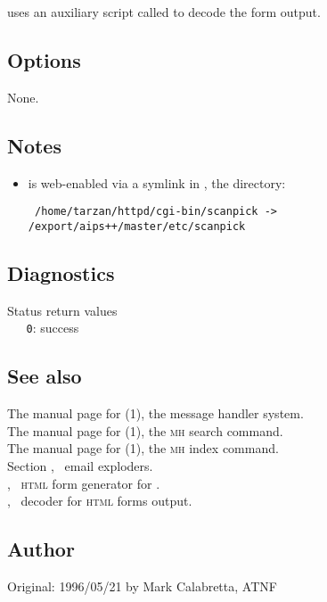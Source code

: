  uses an auxiliary  script called
 to decode the form output.

\subsection*{Options}

None.

\subsection*{Notes}

\begin{itemize}
\item
    is web-enabled via a symlink in
   , the  
   directory:

\begin{verbatim}
 /home/tarzan/httpd/cgi-bin/scanpick -> /export/aips++/master/etc/scanpick
\end{verbatim}
\end{itemize}

\subsection*{Diagnostics}

Status return values
\\ \verb+   0+: success

\subsection*{See also}

The manual page for (1), the message handler system.\\
The manual page for (1), the \textsc{mh} search command.\\
The manual page for (1), the \textsc{mh} index command.\\
Section , \aipspp\ email exploders.\\
, \aipspp\ \textsc{html} form generator for .\\
, \aipspp\ decoder for \textsc{html} forms output.

\subsection*{Author}

Original: 1996/05/21 by Mark Calabretta, ATNF
